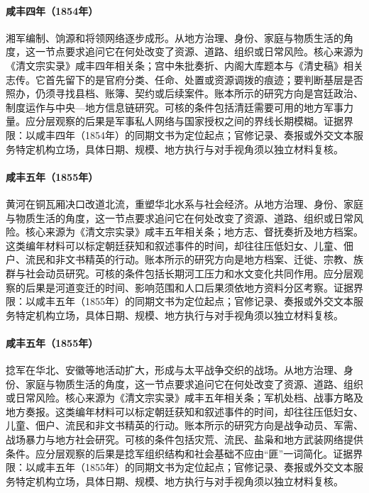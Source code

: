 \hypertarget{social:EQ-1854-XIANG-ARMY-ORGANIZATION}{}\paragraph{咸丰四年（1854年）}湘军编制、饷源和将领网络逐步成形。从地方治理、身份、家庭与物质生活的角度，这一节点要求追问它在何处改变了资源、道路、组织或日常风险。核心来源为《清文宗实录》咸丰四年相关条；宫中朱批奏折、内阁大库题本与《清史稿》相关志传。它首先留下的是官府分类、任命、处置或资源调拨的痕迹；要判断基层是否照办，仍须寻找县档、账簿、契约或后续案件。账本所示的研究方向是宫廷政治、制度运作与中央—地方信息链研究。可核的条件包括清廷需要可用的地方军事力量。应分层观察的后果是军事私人网络与国家授权之间的界线长期模糊。证据界限：以咸丰四年（1854年）的同期文书为定位起点；官修记录、奏报或外交文本服务特定机构立场，具体日期、规模、地方执行与对手视角须以独立材料复核。
\hypertarget{social:EQ-1855-YELLOW-RIVER-COURSE-SHIFT}{}\paragraph{咸丰五年（1855年）}黄河在铜瓦厢决口改道北流，重塑华北水系与社会经济。从地方治理、身份、家庭与物质生活的角度，这一节点要求追问它在何处改变了资源、道路、组织或日常风险。核心来源为《清文宗实录》咸丰五年相关条；地方志、督抚奏折及地方档案。这类编年材料可以标定朝廷获知和叙述事件的时间，却往往压低妇女、儿童、佃户、流民和非文书精英的行动。账本所示的研究方向是地方档案、迁徙、宗教、族群与社会动员研究。可核的条件包括长期河工压力和水文变化共同作用。应分层观察的后果是河道变迁的时间、影响范围和人口后果须依地方资料分区考察。证据界限：以咸丰五年（1855年）的同期文书为定位起点；官修记录、奏报或外交文本服务特定机构立场，具体日期、规模、地方执行与对手视角须以独立材料复核。
\hypertarget{social:EQ-1855-NIAN-REBELLION-EXPANSION}{}\paragraph{咸丰五年（1855年）}捻军在华北、安徽等地活动扩大，形成与太平战争交织的战场。从地方治理、身份、家庭与物质生活的角度，这一节点要求追问它在何处改变了资源、道路、组织或日常风险。核心来源为《清文宗实录》咸丰五年相关条；军机处档、战事方略及地方奏报。这类编年材料可以标定朝廷获知和叙述事件的时间，却往往压低妇女、儿童、佃户、流民和非文书精英的行动。账本所示的研究方向是战争动员、军需、战场暴力与地方社会研究。可核的条件包括灾荒、流民、盐枭和地方武装网络提供条件。应分层观察的后果是捻军组织结构和社会基础不应由“匪”一词简化。证据界限：以咸丰五年（1855年）的同期文书为定位起点；官修记录、奏报或外交文本服务特定机构立场，具体日期、规模、地方执行与对手视角须以独立材料复核。
